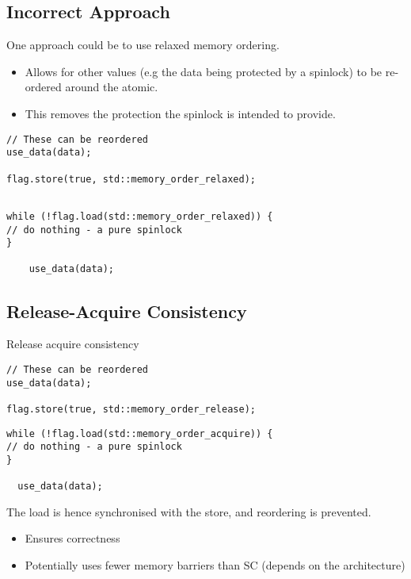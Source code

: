 \subsection{Incorrect Approach}
One approach could be to use relaxed memory ordering.
\begin{itemize}
	\item Allows for other values (e.g the data being protected by a spinlock) to be re-ordered around the atomic.
	\item This removes the protection the spinlock is intended to provide.
\end{itemize}
\noindent
\begin{minipage}{.49\textwidth}
	\begin{verbatim}
// These can be reordered
use_data(data);

flag.store(true, std::memory_order_relaxed);
  
    \end{verbatim}
\end{minipage}
\hfill
\begin{minipage}{.49\textwidth}
	\begin{verbatim}
while (!flag.load(std::memory_order_relaxed)) {
// do nothing - a pure spinlock
}

    use_data(data);
    \end{verbatim}
\end{minipage}

\subsection{Release-Acquire Consistency}
Release acquire consistency
\\ \begin{minipage}{.49\textwidth}
	\begin{verbatim}
// These can be reordered
use_data(data);

flag.store(true, std::memory_order_release);

  \end{verbatim}
\end{minipage}
\hfill
\begin{minipage}{.49\textwidth}
	\begin{verbatim}
while (!flag.load(std::memory_order_acquire)) {
// do nothing - a pure spinlock
}

  use_data(data);
  \end{verbatim}
\end{minipage}
The load is hence synchronised with the store, and reordering is prevented.
\begin{itemize}
	\item Ensures correctness
	\item Potentially uses fewer memory barriers than SC (depends on the architecture)
\end{itemize}
